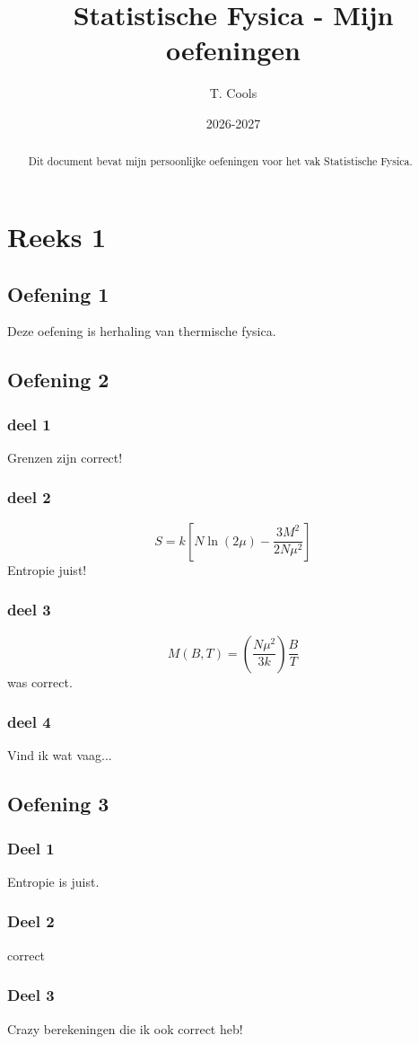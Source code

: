 \documentclass[a4paper,twoside]{article}
\title{Statistische Fysica - Mijn oefeningen}
\author{T. Cools}
\date{2026-2027}
\theoremstyle{definition}
\theoremstyle{plain}
\begin{document}
\maketitle
\begin{abstract}
    Dit document bevat mijn persoonlijke oefeningen voor het vak Statistische Fysica.
\end{abstract}

\section{Reeks 1}
\subsection{Oefening 1}
Deze oefening is herhaling van thermische fysica.
\subsection{Oefening 2}
\subsubsection{deel 1}
Grenzen zijn correct!
\subsubsection{deel 2}
\[
S = k\left[N\ln(2\mu) - \frac{3 M^2}{2N\mu^2}\right]
\]
Entropie juist!
\subsubsection{deel 3}
\[
M(B,T) = \left(\frac{N \mu^2}{3k}\right) \frac{B}{T}
\]
was correct.
\subsubsection{deel 4}
Vind ik wat vaag...
\subsection{Oefening 3}
\subsubsection{Deel 1}
Entropie is juist.
\subsubsection{Deel 2}
correct
\subsubsection{Deel 3}
Crazy berekeningen die ik ook correct heb!
\end{document}
